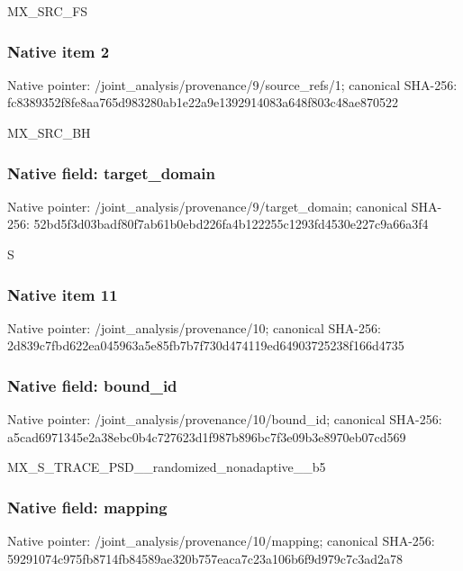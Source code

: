 \documentclass[10pt,a4paper]{article}
\begin{document}
\begingroup\raggedright\sloppy MX\_\allowbreak{}SRC\_\allowbreak{}FS\par\endgroup

\subsubsection{Native item 2}
Native pointer: /joint\_\allowbreak{}analysis/provenance/9/source\_\allowbreak{}refs/1; canonical SHA-256: fc8389352f8fe8aa765d983280ab1e22a9e1392914083a648f803c48ae870522

\begingroup\raggedright\sloppy MX\_\allowbreak{}SRC\_\allowbreak{}BH\par\endgroup

\subsubsection{Native field: target\_\allowbreak{}domain}
Native pointer: /joint\_\allowbreak{}analysis/provenance/9/target\_\allowbreak{}domain; canonical SHA-256: 52bd5f3d03badf80f7ab61b0ebd226fa4b122255c1293fd4530e227c9a66a3f4

\begingroup\raggedright\sloppy S\par\endgroup

\subsubsection{Native item 11}
Native pointer: /joint\_\allowbreak{}analysis/provenance/10; canonical SHA-256: 2d839c7fbd622ea045963a5e85fb7b7f730d474119ed64903725238f166d4735

\subsubsection{Native field: bound\_\allowbreak{}id}
Native pointer: /joint\_\allowbreak{}analysis/provenance/10/bound\_\allowbreak{}id; canonical SHA-256: a5cad6971345e2a38ebc0b4c727623d1f987b896bc7f3e09b3e8970eb07cd569

\begingroup\raggedright\sloppy MX\_\allowbreak{}S\_\allowbreak{}TRACE\_\allowbreak{}PSD\_\allowbreak{}\_\allowbreak{}randomized\_\allowbreak{}nonadaptive\_\allowbreak{}\_\allowbreak{}b5\par\endgroup

\subsubsection{Native field: mapping}
Native pointer: /joint\_\allowbreak{}analysis/provenance/10/mapping; canonical SHA-256: 59291074c975fb8714fb84589ae320b757eaca7c23a106b6f9d979c7c3ad2a78
\end{document}
